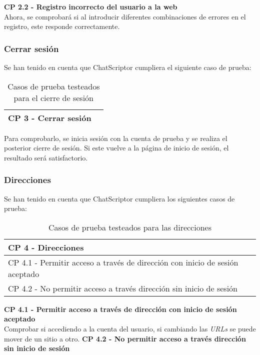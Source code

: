 \textbf{CP 2.2 - Registro incorrecto del usuario a la web} \\
Ahora, se comprobará si al introducir diferentes combinaciones de errores en el registro, este responde correctamente.

\subsubsection{Cerrar sesión}
Se han tenido en cuenta que ChatScriptor cumpliera el siguiente caso de prueba: 

\begin{table}[H]
\centering
\begin{tabular}{ll}
\toprule
CP 3 - Cerrar sesión   \\
\bottomrule
\end{tabular}
\caption{Casos de prueba testeados para el cierre de sesión}
\end{table}

Para comprobarlo, se inicia sesión con la cuenta de prueba y se realiza el posterior cierre de sesión. Si este vuelve a la página de inicio de sesión, el resultado será satisfactorio.


\subsubsection{Direcciones}
Se han tenido en cuenta que ChatScriptor cumpliera los siguientes casos de prueba:

\begin{table}[H]
\centering
\begin{tabular}{ll}
\toprule
CP 4 - Direcciones   \\
\midrule
CP 4.1 - Permitir acceso a través de dirección con inicio de sesión aceptado   \\
CP 4.2 - No permitir acceso a través dirección sin inicio de sesión \\
\bottomrule
\end{tabular}
\caption{Casos de prueba testeados para las direcciones}
\end{table}

\textbf{CP 4.1 - Permitir acceso a través de dirección con inicio de sesión aceptado} \\
Comprobar si accediendo a la cuenta del usuario, si cambiando las \textit{URLs} se puede mover de un sitio a otro.
\textbf{CP 4.2 - No permitir acceso a través dirección sin inicio de sesión}

